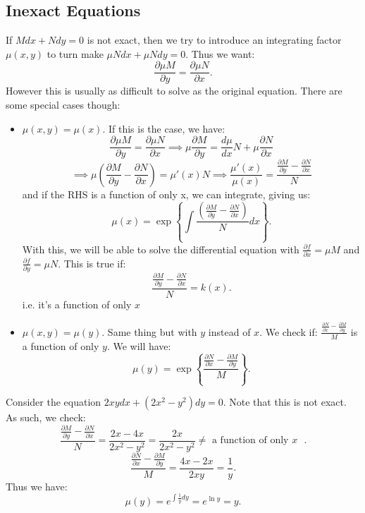 \documentclass[../main/main.tex]{subfiles}
\begin{document}
\subsection{Inexact Equations}
If $M dx + Ndy = 0$ is not exact, then we try to introduce an integrating factor $\mu(x,y)$ to turn make $\mu N dx+\mu N dy = 0$. Thus we want: \[
 \frac{\partial \mu M}{\partial y}  = \frac{\partial \mu N}{\partial x} 
.\] However this is usually as difficult to solve as the original equation. There are some special cases though: 
\begin{itemize}
	\item $\mu(x,y) = \mu(x)$. If this is the case, we have: \[
	\frac{\partial \mu M}{\partial y}  = \frac{\partial \mu N}{\partial x} 
	\implies \mu \frac{\partial M}{\partial y}  = \frac{d \mu}{d x} N + \mu \frac{\partial N}{\partial x} 
	\] \[
	\implies \mu\left( \frac{\partial M}{\partial y} -\frac{\partial N}{\partial x}  \right) =\mu'(x)N \implies \frac{\mu'(x)}{\mu(x)}= \frac{\frac{\partial M}{\partial y} -\frac{\partial N}{\partial x} }{N}
	\] and if the RHS is a function of only x, we can integrate, giving us: \[
	\mu(x) = \exp\left\{\int \frac{\left( \frac{\partial M}{\partial y} -\frac{\partial N}{\partial x}  \right) }{N}dx\right\}
	.\] With this, we will be able to solve the differential equation with $\frac{\partial f}{\partial x} =\mu M$ and $\frac{\partial f}{\partial y} =\mu N$. This is true if: \[
	\frac{\frac{\partial M}{\partial y} -\frac{\partial N}{\partial x} }{N} = k(x)
	.\] i.e. it's a function of only $x$
\item $\mu(x,y)=\mu(y)$. Same thing but with $y$ instead of  $x$. We check if: $\frac{\frac{\partial N}{\partial x} -\frac{\partial M}{\partial y} }{M}$ is a function of only $y$. We will have:  \[
		\mu(y) = \exp\left\{\frac{\frac{\partial N}{\partial x} -\frac{\partial M}{\partial y} }{M}\right\}
.\] 
\end{itemize}
\begin{example}
	Consider the equation $2xydx+(2x^2-y^2)dy=0$. Note that this is not exact. As such, we check: \[
		\frac{\frac{\partial M}{\partial y} -\frac{\partial N}{\partial x} }{N}=\frac{2x-4x}{2x^2-y^2}=\frac{2x}{2x^2-y^2}\neq \text{ a function of only $x$ }
	.\] \[
	\frac{\frac{\partial N}{\partial x} -\frac{\partial M}{\partial y} }{M}=\frac{4x-2x}{2xy}=\frac{1}{y}
	.\] Thus we have: \[
	\mu(y) = e^{\int \frac{1}{y}dy}=e^{\ln y}= y
	.\] 
\end{example}
\end{document}
